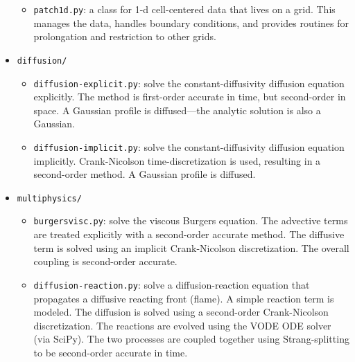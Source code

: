 \begin{itemize}
\begin{itemize}
  \item {\tt patch1d.py}: a class for 1-d cell-centered data that
    lives on a grid.  This manages the data, handles boundary
    conditions, and provides routines for prolongation and restriction
    to other grids.

  \end{itemize}

\item {\tt diffusion/}

  \begin{itemize}
    \item {\tt diffusion-explicit.py}: solve the constant-diffusivity
      diffusion equation explicitly.  The method is first-order
      accurate in time, but second-order in space.  A Gaussian profile
      is diffused---the analytic solution is also a Gaussian.

    \item {\tt diffusion-implicit.py}: solve the constant-diffusivity
      diffusion equation implicitly.  Crank-Nicolson time-discretization
      is used, resulting in a second-order method.  A Gaussian profile
      is diffused.

  \end{itemize}
  
\item {\tt multiphysics/}

  \begin{itemize}
  \item {\tt burgersvisc.py}: solve the viscous Burgers equation.
     The advective terms are treated explicitly with a second-order
     accurate method.  The diffusive term is solved using an 
     implicit Crank-Nicolson discretization.  The overall coupling
     is second-order accurate.

  \item {\tt diffusion-reaction.py}: solve a diffusion-reaction
    equation that propagates a diffusive reacting front (flame).  A
    simple reaction term is modeled.  The diffusion is solved using
    a second-order Crank-Nicolson discretization.  The reactions
    are evolved using the VODE ODE solver (via SciPy).  The two
    processes are coupled together using Strang-splitting to be
    second-order accurate in time.
     

  \end{itemize}

\end{itemize}


